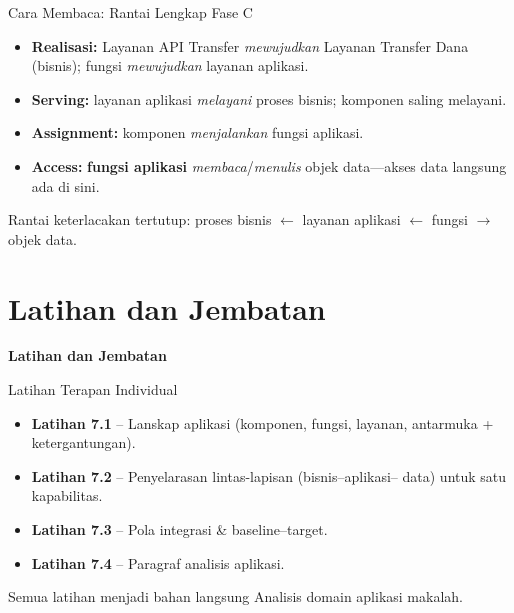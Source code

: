 \documentclass[aspectratio=169, table]{beamer}
\newcommand{\sectionframe}[1]{%
  \begin{frame}{\hfill}
    \centering
    \Huge{\textbf{#1}}
  \end{frame}
}
\newcommand{\takeaway}[1]{%
  \vspace{4pt}
  {\footnotesize #1}
}
\begin{document}
\begin{frame}{Cara Membaca: Rantai Lengkap Fase C}
  \vspace{4pt}
  \footnotesize
  \begin{itemize}\setlength{\itemsep}{2.5pt}
    \item \textbf{Realisasi:} Layanan API Transfer \emph{mewujudkan} Layanan
          Transfer Dana (bisnis); fungsi \emph{mewujudkan} layanan aplikasi.
    \item \textbf{Serving:} layanan aplikasi \emph{melayani} proses bisnis;
          komponen saling melayani.
    \item \textbf{Assignment:} komponen \emph{menjalankan} fungsi aplikasi.
    \item \textbf{Access:} \textbf{fungsi aplikasi} \emph{membaca}/\emph{menulis}
          objek data---akses data langsung ada di sini.
  \end{itemize}
  \takeaway{Rantai keterlacakan tertutup: proses bisnis $\leftarrow$ layanan
  aplikasi $\leftarrow$ fungsi $\rightarrow$ objek data.}
\end{frame}

\section{Latihan dan Jembatan}
\sectionframe{Latihan dan Jembatan}

\begin{frame}{Latihan Terapan Individual}
  \vspace{8pt}
  \begin{itemize}
    \item \textbf{Latihan 7.1} -- Lanskap aplikasi (komponen, fungsi, layanan,
          antarmuka + ketergantungan).
    \item \textbf{Latihan 7.2} -- Penyelarasan lintas-lapisan (bisnis--aplikasi--
          data) untuk satu kapabilitas.
    \item \textbf{Latihan 7.3} -- Pola integrasi \& baseline--target.
    \item \textbf{Latihan 7.4} -- Paragraf analisis aplikasi.
  \end{itemize}
  \takeaway{Semua latihan menjadi bahan langsung Analisis domain aplikasi
  makalah.}
\end{frame}
\end{document}
